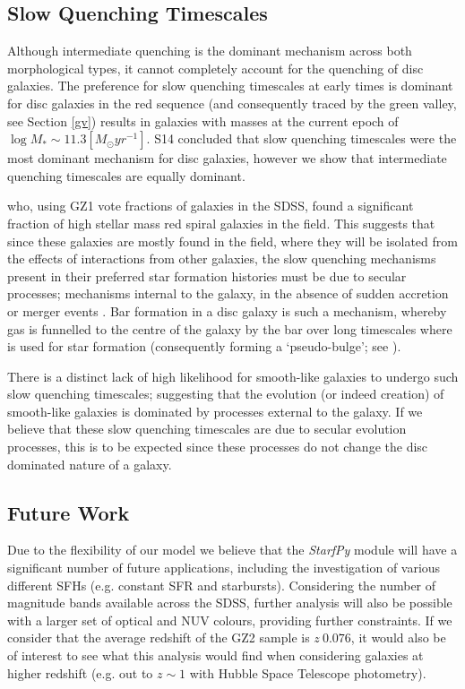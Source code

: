 \documentclass[useAMS,usenatbib]{mn2e}
\begin{document}
\subsection{Slow Quenching Timescales}
Although intermediate quenching is the dominant mechanism across both morphological types, it cannot completely account for the quenching of disc galaxies. The preference for slow quenching timescales at early times is dominant for disc galaxies in the red sequence (and consequently traced by the green valley, see Section \ref{gv}) results in galaxies with masses at the current epoch of $\log M_* \sim 11.3 [M_{\odot} yr^{-1}] $. S14 concluded that slow quenching timescales were the most dominant mechanism for disc galaxies, however we show that intermediate quenching timescales are equally dominant. 

\citet{Bamford09} who, using GZ1 vote fractions of galaxies in the SDSS, found a significant fraction of high stellar mass red spiral galaxies in the field. This suggests that since these galaxies are mostly found in the field, where they will be isolated from the effects of interactions from other galaxies, the slow quenching mechanisms present in their preferred star formation histories must be due to secular processes; mechanisms internal to the galaxy, in the absence of sudden accretion or merger events \citep{KK04, Sheth12}. Bar formation in a disc galaxy is such a mechanism, whereby gas is funnelled to the centre of the galaxy by the bar over long timescales where is used for star formation (consequently forming a `pseudo-bulge'; see \citealt{Kormendy10, Simmons13}).

There is a distinct lack of high likelihood for smooth-like galaxies to undergo such slow quenching timescales; suggesting that the evolution (or indeed creation) of smooth-like galaxies is dominated by processes external to the galaxy. If we believe that these slow quenching timescales are due to secular evolution processes, this is to be expected since these processes do not change the disc dominated nature of a galaxy. 

\subsection{Future Work}\label{future}
Due to the flexibility of our model we believe that the \emph{StarfPy} module will have a significant number of future applications, including the investigation of various different SFHs (e.g. constant SFR and starbursts). Considering the number of magnitude bands available across the SDSS, further analysis will also be possible with a larger set of optical and NUV colours, providing further constraints. If we consider that the average redshift of the GZ2 sample is $z~0.076$, it would also be of interest to see what this analysis would find when considering galaxies at higher redshift (e.g. out to $z\sim1$ with Hubble Space Telescope photometry). 
\end{document}
